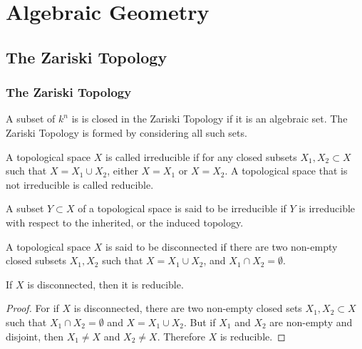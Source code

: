 \documentclass[crop=false,class=article,oneside]{standalone}
\begin{document}
    \ifx\ifmathcoursesalgebraicgeometry\undefined
        \section*{Algebraic Geometry}
        \setcounter{section}{1}
    \fi
    \subsection{The Zariski Topology}
        \subsubsection{The Zariski Topology}
            \begin{definition}
                A subset of $k^{n}$ is is closed in the
                Zariski Topology if it is an algebraic set.
                The Zariski Topology is formed by
                considering all such sets.
            \end{definition}
            \begin{definition}
                A topological space $X$ is called irreducible if
                for any closed subsets $X_1,X_2\subset X$ such that
                $X=X_{1}\cup{X_{2}}$, either $X=X_{1}$ or
                $X=X_{2}$. A topological space that is
                not irreducible is called reducible.
            \end{definition}
            \begin{definition}
                A subset $Y\subset X$ of a topological space
                is said to be irreducible if $Y$ is irreducible
                with respect to the inherited,
                or the induced topology.
            \end{definition}
            \begin{definition}
                A topological space $X$ is said to be disconnected
                if there are two non-empty closed subsets $X_1,X_2$
                such that $X=X_1\cup X_2$,
                and $X_1\cap X_2 = \emptyset$.
            \end{definition}
            \begin{theorem}
                If $X$ is disconnected, then it is reducible.
            \end{theorem}
            \begin{proof}
                For if $X$ is disconnected, there are two
                non-empty closed sets $X_1,X_2\subset X$ such
                that $X_1\cap X_2 = \emptyset$ and
                $X=X_1\cup X_2$. But if $X_1$ and $X_2$
                are non-empty and disjoint, then
                $X_1\ne X$ and $X_2 \ne X$.
                Therefore $X$ is reducible.
            \end{proof}
\end{document}
